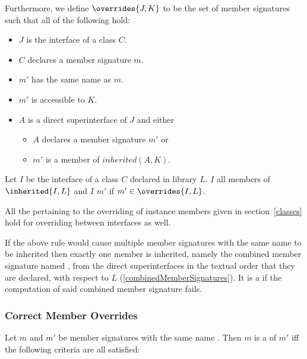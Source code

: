 \documentclass[makeidx]{article}
\begin{document}
\LMHash{}%
Furthermore, we define $\overrides{J, K}$ to be
the set of member signatures 
such that all of the following hold:
\begin{itemize}
\item $J$ is the interface of a class $C$.
\item $C$ declares a member signature $m$.
\item $m'$ has the same name as $m$.
\item $m'$ is accessible to $K$.
\item $A$ is a direct superinterface of $J$ and either
  \begin{itemize}
  \item $A$ declares a member signature $m'$ or
  \item $m'$ is a member of $inherited(A, K)$.
  \end{itemize}
\end{itemize}

\LMHash{}%
Let $I$ be the interface of a class $C$ declared in library $L$.
$I$  all members of $\inherited{I, L}$
and $I$  $m'$ if $m' \in \overrides{I, L}$.

\LMHash{}%
All the  pertaining to
the overriding of instance members
given in section~\ref{classes} hold for overriding between interfaces as well.

\LMHash{}%
If the above rule would cause multiple member signatures
with the same name \id{} to be inherited then
exactly one member is inherited, namely
the combined member signature named \id,
from the direct superinterfaces
in the textual order that they are declared,
with respect to $L$
(\ref{combinedMemberSignatures}).
It is a 
if the computation of said combined member signature fails.


\subsubsection{Correct Member Overrides}

\LMHash{}%
%
Let $m$ and $m'$ be member signatures with the same name \id.
Then $m$ is a  of $m'$
if{}f the following criteria are all satisfied:
\end{document}

